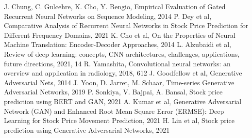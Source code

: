 \documentclass[11pt]{article} %
\begin{document}
\begin{figure}
\begin{adjustbox}{width=1.3\textwidth,center}

\end{adjustbox}
\end{figure}


\begin{figure}
\begin{adjustbox}{width=1.3\textwidth,center}

\end{adjustbox}
\end{figure}


\begin{figure}
\begin{adjustbox}{width=1.3\textwidth,center}

\end{adjustbox}
\end{figure}

\begin{figure}
\begin{adjustbox}{width=1.3\textwidth,center}

\end{adjustbox}
\end{figure}

\begin{thebibliography}{9}
J. Chung, C. Gulcehre, K. Cho, Y. Bengio, Empirical Evaluation of Gated Recurrent Neural Networks on Sequence Modeling, 2014
P. Dey et al, Comparative Analysis of Recurrent Neural Networks in Stock Price Prediction for Different Frequency Domains, 2021 
K. Cho et al, On the Properties of Neural Machine Translation: Encoder-Decoder Approaches, 2014
L. Alzubaidi et al, Review of deep learning: concepts, CNN architectures, challenges, applications, future directions, 2021, 14
R. Yamashita, Convolutional neural networks: an overview and application in radiology, 2018, 612
J. Goodfellow et al, Generative Adversarial Nets, 2014
J. Yoon, D. Jarret, M. Schaar, Time-series Generative Adversarial Networks, 2019
P. Sonkiya, V. Bajpai, A. Bansal, Stock price prediction using BERT and GAN, 2021
A. Kumar et al, Generative Adversarial Network (GAN) and Enhanced Root Mean Square Error (ERMSE): Deep Learning for Stock Price Movement Prediction, 2021
H. Lin et al, Stock price prediction using Generative Adversarial Networks, 2021 


\end{thebibliography}
\end{document}
